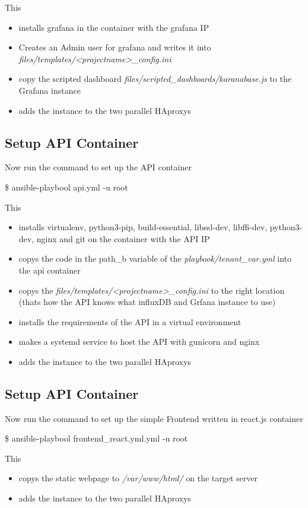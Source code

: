 This
\begin{itemize}
	\item installs grafana in the container with the grafana IP
	\item Creates an Admin user for grafana and writes it into  \textit{files/templates/<projectname>\_config.ini}
	\item copy the scripted dashboard  \textit{files/scripted\_dashboards/karanabase.js} to the Grafana instance
	\item adds the instance to the two parallel HAproxys
\end{itemize}

\subsection{Setup API Container}
Now run the command to set up the API container
\begin{tcolorbox}
	\$	ansible-playbool api.yml -u root
\end{tcolorbox}

This
\begin{itemize}
	\item installs virtualenv, python3-pip, build-essential, libssl-dev, libffi-dev, python3-dev, nginx and git on the container with the API IP
	\item copys the code in the path\_b variable of the \textit{playbook/tenant\_var.yml} into the api container
	\item copys the \textit{files/templates/<projectname>\_config.ini} to the right location (thats how the API knows what influxDB and Grfana instance to use)
	\item installs the requirements of the API in a virtual environment
	\item makes a systemd service to host the API with gunicorn and nginx
	\item adds the instance to the two parallel HAproxys
\end{itemize}

\subsection{Setup API Container}
Now run the command to set up the simple Frontend written in react.js container
\begin{tcolorbox}
	\$	ansible-playbool frontend\_react.yml.yml -u root
\end{tcolorbox}

This
\begin{itemize}
	\item copys the static webpage to \textit{/var/www/html/} on the target server
	\item adds the instance to the two parallel HAproxys
\end{itemize}
